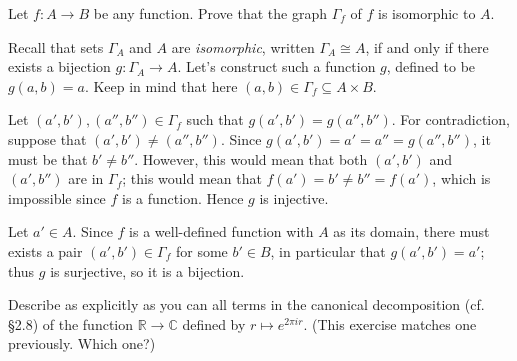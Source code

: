 \begin{problem}[2.7]
	Let $f:A\to B$ be any function. Prove that the graph $\Gamma_f$ of $f$ is
	isomorphic to $A$.
\end{problem}

\begin{solution}
	Recall that sets $\Gamma_A$ and $A$ are \textit{isomorphic}, written
	$\Gamma_A\cong A$, if and only if there exists a bijection $g:\Gamma_A\to A$.
	Let's construct such a function $g$, defined to be $g(a,b) = a$. Keep in mind
	that here $(a,b)\in\Gamma_f\subseteq A\times B$.
	
	Let $(a',b'),(a'',b'')\in\Gamma_f$ such that $g(a',b') = g(a'',b'')$. For
	contradiction, suppose that $(a',b')\neq (a'',b'')$. Since $g(a',b') = a' = a''
	= g(a'',b'')$, it must be that $b'\neq b''$. However, this would mean that both
	$(a',b')$ and $(a',b'')$ are in $\Gamma_f$; this would mean that $f(a') = b'
	\neq b'' = f(a')$, which is impossible since $f$ is a function. Hence $g$ is
	injective.
	
	Let $a'\in A$. Since $f$ is a well-defined function with $A$ as its domain,
	there must exists a pair $(a',b')\in\Gamma_f$ for some $b'\in B$, in particular
	that $g(a',b') = a'$; thus $g$ is surjective, so it is a bijection.
\end{solution}


\begin{problem}[2.8]
	Describe as explicitly as you can all terms in the canonical decomposition (cf.
	\S2.8) of the function $\mathbb{R}\to\mathbb{C}$ defined by $r\mapsto e^{2\pi
		ir}$. (This exercise matches one previously. Which one?)
\end{problem}

